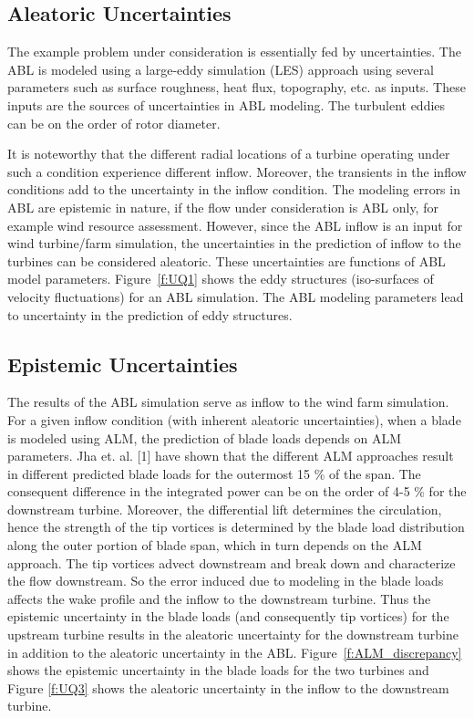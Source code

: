 \documentclass[]{aiaa-tc}%
\begin{document}
\subsection{Aleatoric Uncertainties}

The example problem under consideration is essentially fed by uncertainties. The ABL is modeled using a large-eddy simulation (LES) approach\cite{churchfield:aiaa2012} using several parameters such as surface roughness, heat flux, topography, etc. as inputs. These inputs are the sources of uncertainties in ABL modeling. The turbulent eddies can be on the order of rotor diameter. 

It is noteworthy that the different radial locations of a turbine operating under such a condition experience different inflow. Moreover, the transients in the inflow conditions add to the uncertainty in the inflow condition. The modeling errors in ABL are epistemic in nature, if the flow under consideration is ABL only, for example wind resource assessment. However, since the ABL inflow is an input for wind turbine/farm simulation, the uncertainties in the prediction of inflow to the turbines can be considered aleatoric. These uncertainties are functions of ABL model parameters. Figure~\ref{f:UQ1} shows the eddy structures (iso-surfaces of velocity fluctuations) for an ABL simulation. The ABL modeling parameters lead to uncertainty in the prediction of eddy structures.

\subsection{Epistemic Uncertainties}

The results of the ABL simulation serve as inflow to the wind farm simulation. For a given inflow condition (with inherent aleatoric uncertainties), when a blade is modeled using ALM, the prediction of blade loads depends on ALM parameters. Jha et. al. [1] have shown that the different ALM approaches result in different predicted blade loads for the outermost 15 \% of the span. The consequent difference in the integrated power can be on the order of 4-5 \% for the downstream turbine. Moreover, the differential lift determines the circulation, hence the strength of the tip vortices is determined by the blade load distribution along the outer portion of blade span, which in turn depends on the ALM approach. The tip vortices advect downstream and break down and characterize the flow downstream. So the error induced due to modeling in the blade loads affects the wake profile and the inflow to the downstream turbine. Thus the epistemic uncertainty in the blade loads (and consequently tip vortices) for the upstream turbine results in the aleatoric uncertainty for the downstream turbine in addition to the aleatoric uncertainty in the ABL. Figure~\ref{f:ALM_discrepancy} shows the epistemic uncertainty in the blade loads for the two turbines and Figure \ref{f:UQ3} shows the aleatoric uncertainty in the inflow to the downstream turbine.
\end{document}
